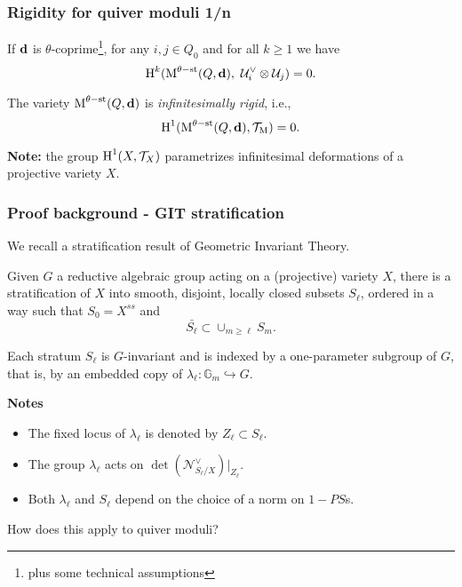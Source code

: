 \documentclass{beamer}
\begin{document}
\begin{frame}
    \frametitle{Rigidity for quiver moduli 1/n}
\begin{theorem}
If $\mathbf{d}$ is $\theta$-coprime\footnote{ plus some technical assumptions}, for any $i, j \in Q_0$ and for all $k \geq 1$ we have
\[\operatorname{H}^{k}(\operatorname{M}^{\theta-\mathrm{st}}(Q, \mathbf{d}),~\mathcal{U}^{\vee}_{i} \otimes \mathcal{U}_j) = 0. \]
\end{theorem} \pause
\begin{corollary}
The variety $\operatorname{M}^{\theta-\mathrm{st}}(Q, \mathbf{d})$ is \emph{infinitesimally rigid}, i.e.,
\[ \operatorname{H}^1(\operatorname{M}^{\theta-\mathrm{st}}(Q, \mathbf{d}), \mathcal{T}_{\operatorname{M}}) = 0. \]
\end{corollary} \pause

{\bf Note:} the group $\operatorname{H}^1(X, \mathcal{T}_{X})$ parametrizes infinitesimal
deformations of a projective variety $X$.
\end{frame}

\begin{frame}
    \frametitle{Proof background - GIT stratification}
We recall a stratification result of Geometric Invariant Theory. \pause
\begin{theorem}
Given $G$ a reductive algebraic group
acting on a (projective) variety $X$,
there is a stratification of $X$
into smooth, disjoint, locally closed subsets $S_{\ell}$,
ordered in a way such that $S_0 = X^{ss}$ and
\[\bar{S_{\ell}} \subset \cup_{m \geq \ell} S_m.\]
\end{theorem} \pause

Each stratum $S_{\ell}$ is $G$-invariant and is indexed by
a one-parameter subgroup of $G$,
that is, by an embedded copy of
$\lambda_{\ell} \colon \mathbb{G}_m \hookrightarrow G$. \pause

{\bf Notes} \pause
\begin{itemize}
    \item The fixed locus of $\lambda_{\ell}$ is denoted by $Z_{\ell} \subset S_{\ell}$. \pause
    \item The group $\lambda_{\ell}$ acts on $\det(\mathcal{N}^{\vee}_{S_{\ell}/X})|_{Z_{\ell}}$. \pause
    \item Both $\lambda_{\ell}$ and $S_{\ell}$ depend on the choice of a norm on $1-PS$s.
\end{itemize} \pause
How does this apply to quiver moduli?
\end{frame}
\end{document}
